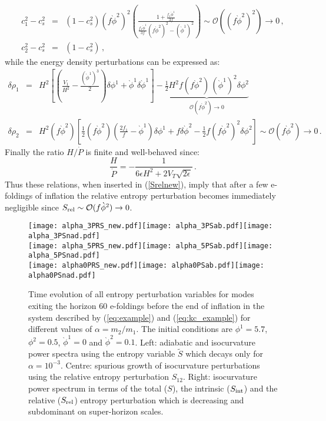 \documentclass[a4paper,11pt]{article}
\def\be{\begin{equation}}
\def\ee{\end{equation}}
\def\bea{\begin{eqnarray}}
\def\eea{\end{eqnarray}}
\newcommand{\mc}{\mathcal}
\begin{document}
\bea
c_1^2-c_s^2&=& (1-c_s^2) (f \grave{\phi}^2)^2\left(\frac{1+\frac{f_1 \grave{\phi}^1}{3f} }{\frac{f_1 \grave{\phi}^1}{3f} (f \grave{\phi}^2)^2-(\grave{\phi}^1)^2}\right)
\sim\mc{O}( (f \grave{\phi}^2)^2)\to 0\,,\\
c_2^2-c_s^2&=&(1-c_s^2)\,,
\eea
while the energy density perturbations can be expressed as:
\bea
\delta\rho_1 &=& H^2 \left[\left(\frac{V_1}{H^2}-\frac{(\grave{\phi}^1)^3}{2}\right)\delta\phi^1+\grave{\phi}^1\delta\grave{\phi}^1\right]- \underbrace{\frac12 H^2 f (f \grave{\phi}^2)\,(\grave{\phi}^1)^2\delta\phi^2}_{\mc{O}( f \grave{\phi}^2)\to 0} \\ 
\delta\rho_2 &=& H^2 (f\grave{\phi}^2) \left[\frac12 (f \grave{\phi}^2) \left(\frac{2 f_1}{f}-\grave{\phi}^1\right)\delta\phi^1+f\delta\grave{\phi}^2-\frac12 f (f\grave{\phi}^2)^2\delta\phi^2\right] \sim\mc{O}( f \grave{\phi}^2)\to 0\,. \nonumber
\eea
Finally the ratio $H/\dot P$ is finite and well-behaved since:
\be
\frac{H}{\dot P} = -\frac{1}{6\epsilon H^2 + 2 V_T \sqrt{2\epsilon} }\,.
\ee
Thus these relations, when inserted in (\ref{Srelnew}), imply that after a few e-foldings of inflation the relative entropy perturbation becomes immediately negligible since $S_{\rm rel}\sim \mc{O}(f\grave{\phi}^2)\rightarrow 0$. 

\begin{figure}[!t]
\begin{center}
\texttt{[image: alpha\_3PRS\_new.pdf]}\texttt{[image: alpha\_3PSab.pdf]}\texttt{[image: alpha\_3PSnad.pdf]}\\
\texttt{[image: alpha\_5PRS\_new.pdf]}\texttt{[image: alpha\_5PSab.pdf]}\texttt{[image: alpha\_5PSnad.pdf]}\\
\texttt{[image: alpha0PRS\_new.pdf]}\texttt{[image: alpha0PSab.pdf]}\texttt{[image: alpha0PSnad.pdf]}\\
\caption{Time evolution of all entropy perturbation variables for modes exiting the horizon $60$ e-foldings before the end of inflation in the system described by (\ref{eq:example}) and (\ref{eq:kc_example}) for different values of $\alpha=m_2/m_1$. The initial conditions are $\phi^1=5.7$, $\phi^2=0.5$, $\grave{\phi}^1=0$ and $\grave{\phi}^2=0.1$. Left: adiabatic and isocurvature power spectra using the entropy variable $\tilde{S}$ which decays only for $\alpha=10^{-3}$. Centre: spurious growth of isocurvature perturbations using the relative entropy perturbation $S_{12}$. Right: isocurvature power spectrum in terms of the total ($S$), the intrinsic ($S_{\rm int}$) and the relative ($S_{\rm rel}$) entropy perturbation which is decreasing and subdominant on super-horizon scales.}
\label{fig:Scomponents}
\end{center}
\end{figure}
\end{document}
